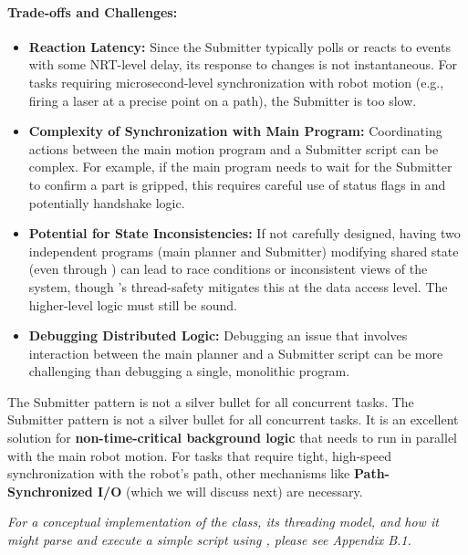 \paragraph{Trade-offs and Challenges:}
\begin{itemize}
    \item \textbf{Reaction Latency:} Since the Submitter typically polls  or reacts to events with some NRT-level delay, its response to changes is not instantaneous. For tasks requiring microsecond-level synchronization with robot motion (e.g., firing a laser at a precise point on a path), the Submitter is too slow.
    \item \textbf{Complexity of Synchronization with Main Program:} Coordinating actions between the main motion program and a Submitter script can be complex. For example, if the main program needs to wait for the Submitter to confirm a part is gripped, this requires careful use of status flags in  and potentially handshake logic.
    \item \textbf{Potential for State Inconsistencies:} If not carefully designed, having two independent programs (main planner and Submitter) modifying shared state (even through ) can lead to race conditions or inconsistent views of the system, though 's thread-safety mitigates this at the data access level. The higher-level logic must still be sound.
    \item \textbf{Debugging Distributed Logic:} Debugging an issue that involves interaction between the main planner and a Submitter script can be more challenging than debugging a single, monolithic program.
\end{itemize}

\begin{principlebox}{The Submitter pattern is not a silver bullet for all concurrent tasks.}
    The Submitter pattern is not a silver bullet for all concurrent tasks. It is an excellent solution for \textbf{non-time-critical background logic} that needs to run in parallel with the main robot motion. For tasks that require tight, high-speed synchronization with the robot's path, other mechanisms like \textbf{Path-Synchronized I/O} (which we will discuss next) are necessary.
\end{principlebox}

\textit{For a conceptual implementation of the  class, its threading model, and how it might parse and execute a simple script using , please see Appendix B.1.}


